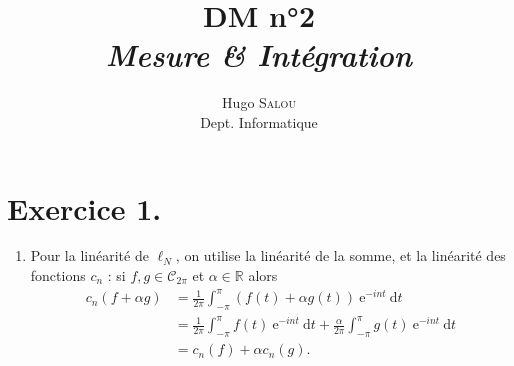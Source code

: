 \documentclass{../../td}
\title{DM n°2\\\itshape Mesure \& Intégration}
\author{Hugo {\scshape Salou}\\ Dept. Informatique}
\begin{document}
  \maketitle

  \chapter*{Exercice 1.}

  \begin{enumerate}
    \item Pour la linéarité de $\ell_N$, on utilise la linéarité de la somme, et la linéarité des fonctions $c_n$ : si $f, g \in \mathcal{C}_{2\pi}$ et $\alpha \in \mathds{R}$ alors \label{ex1-q1}
      \begin{align*}
        c_n(f + \alpha g) &= \frac{1}{2\pi} \int_{-\pi}^\pi (f(t) + \alpha g(t))\:\mathrm{e}^{-int} \:\mathrm{d}t\\
        &= \frac{1}{2\pi} \int_{-\pi}^\pi f(t)\:\mathrm{e}^{-int}\:\mathrm{d}t + \frac{\alpha}{2\pi} \int_{-\pi}^\pi g(t)\:\mathrm{e}^{-int}\: \mathrm{d}t \\
        &= c_n(f) + \alpha c_n(g)
      .\end{align*}


\end{enumerate}
\end{document}
